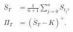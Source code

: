 \documentclass{equation-sheet}
\begin{document}
\begin{equation*}
\begin{aligned}
\overline{S}_T
  &= \frac{1}{n+1}\sum_{j=0}^{n} S_{t_j}, \\[0.55em]
\Pi_T &= (\overline{S}_T-K)^{+}.
\end{aligned}
\end{equation*}
\end{document}
